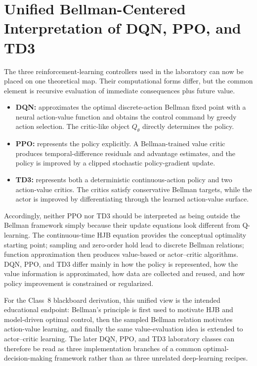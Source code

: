\documentclass[11pt]{article}
\begin{document}
\section{Unified Bellman-Centered Interpretation of DQN, PPO, and TD3}

The three reinforcement-learning controllers used in the laboratory can now be placed on one theoretical map. Their computational forms differ, but the common element is recursive evaluation of immediate consequences plus future value.

\begin{itemize}
\item \textbf{DQN:} approximates the optimal discrete-action Bellman fixed point with a neural action-value function and obtains the control command by greedy action selection. The critic-like object $Q_{\theta}$ directly determines the policy.
\item \textbf{PPO:} represents the policy explicitly. A Bellman-trained value critic produces temporal-difference residuals and advantage estimates, and the policy is improved by a clipped stochastic policy-gradient update.
\item \textbf{TD3:} represents both a deterministic continuous-action policy and two action-value critics. The critics satisfy conservative Bellman targets, while the actor is improved by differentiating through the learned action-value surface.
\end{itemize}

Accordingly, neither PPO nor TD3 should be interpreted as being outside the Bellman framework simply because their update equations look different from Q-learning. The continuous-time HJB equation provides the conceptual optimality starting point; sampling and zero-order hold lead to discrete Bellman relations; function approximation then produces value-based or actor--critic algorithms. DQN, PPO, and TD3 differ mainly in how the policy is represented, how the value information is approximated, how data are collected and reused, and how policy improvement is constrained or regularized.

For the Class~8 blackboard derivation, this unified view is the intended educational endpoint: Bellman's principle is first used to motivate HJB and model-driven optimal control, then the sampled Bellman relation motivates action-value learning, and finally the same value-evaluation idea is extended to actor--critic learning. The later DQN, PPO, and TD3 laboratory classes can therefore be read as three implementation branches of a common optimal-decision-making framework rather than as three unrelated deep-learning recipes.
\end{document}
